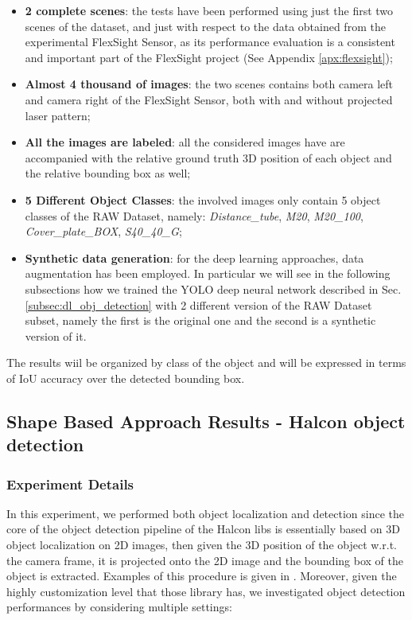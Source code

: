 \begin{itemize}
	\item \textbf{2 complete scenes}: the tests have been performed using just the first two scenes of the dataset, and just with respect to the data obtained from the experimental FlexSight Sensor, as its performance evaluation is a consistent and important part of the FlexSight project (See Appendix \ref{apx:flexsight});
	\item \textbf{Almost 4 thousand of images}: the two scenes contains both camera left and camera right of the FlexSight Sensor, both with and without projected laser pattern;
	\item \textbf{All the images are labeled}: all the considered images have are accompanied with the relative ground truth 3D position of each object and the relative bounding box as well;
	\item \textbf{5 Different Object Classes}: the involved images only contain 5 object classes of the RAW Dataset, namely: \emph{Distance\_tube}, \emph{M20}, \emph{M20\_100}, \emph{Cover\_plate\_BOX}, \emph{S40\_40\_G};
	\item \textbf{Synthetic data generation}: for the deep learning approaches, data augmentation has been employed. In particular we will see in the following subsections how we trained the YOLO deep neural network described in Sec. \ref{subsec:dl_obj_detection} with 2 different version of the RAW Dataset subset, namely the first is the original one and the second is a synthetic version of it.
\end{itemize}

The results wiil be organized by class of the object and will be expressed in terms of IoU accuracy over the detected bounding box.

\subsection{Shape Based Approach Results - Halcon object detection}\label{subsec:halcon_obj_det_results}
\subsubsection{Experiment Details}
In this experiment, we performed both object localization and detection since the core of the object detection pipeline of the Halcon libs is essentially based on 3D object localization on 2D images, then given the 3D position of the object w.r.t. the camera frame, it is projected onto the 2D image and the bounding box of the object is extracted. Examples of this procedure is given in . Moreover, given the highly customization level that those library has, we investigated object detection performances by considering multiple settings:

